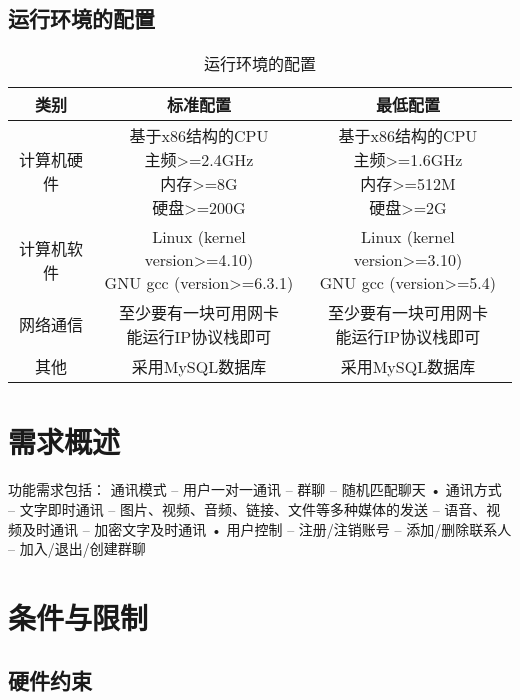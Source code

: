 \subsection{运行环境的配置}
\begin{table}[htbp]
\centering
\caption{运行环境的配置} \label{tab:operation-environment}
\begin{tabular}{|c|c|c|}
    \hline
    类别 & 标准配置 & 最低配置 \\
    \hline
    计算机硬件 & \tabincell{c}{基于x86结构的CPU\\ 主频>=2.4GHz\\ 内存>=8G\\ 硬盘>=200G} & \tabincell{c}{基于x86结构的CPU\\ 主频>=1.6GHz\\ 内存>=512M\\ 硬盘>=2G} \\
    \hline
    计算机软件 & \tabincell{c}{Linux (kernel version>=4.10)\\ GNU gcc (version>=6.3.1)} & \tabincell{c}{Linux (kernel version>=3.10)\\ GNU gcc (version>=5.4)} \\
    \hline
    网络通信 & \tabincell{c}{至少要有一块可用网卡\\ 能运行IP协议栈即可} & \tabincell{c}{至少要有一块可用网卡\\ 能运行IP协议栈即可} \\
    \hline
    其他 & 采用MySQL数据库 & 采用MySQL数据库 \\
    \hline

\end{tabular}
\end{table}

\section{需求概述}
功能需求包括：
通讯模式
– 用户一对一通讯
– 群聊
– 随机匹配聊天
• 通讯方式
– 文字即时通讯
– 图片、视频、音频、链接、文件等多种媒体的发送
– 语音、视频及时通讯
– 加密文字及时通讯
• 用户控制
– 注册/注销账号
– 添加/删除联系人
– 加入/退出/创建群聊

\section{条件与限制}
\subsection{硬件约束}

